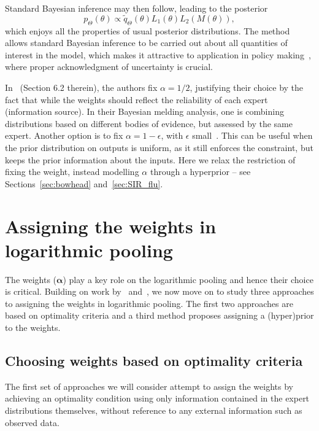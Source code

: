 \documentclass[a4paper, notitlepage, 11pt]{article}
\begin{document}
Standard Bayesian inference may then follow,  leading to the posterior
\begin{equation}
 \label{eq:BMpoolposterior}
 p_{\Theta}(\theta) \propto \tilde{q}_{\Theta}(\theta) L_1(\theta) L_2(M(\theta)),
\end{equation}
which enjoys all the properties of usual posterior distributions.
The method allows standard Bayesian inference to be carried out about all quantities of interest in the model, which makes it attractive to application in policy making~\citep{Alkema2008}, where proper acknowledgment of uncertainty is crucial.

In~\cite{Poole2000} (Section 6.2 therein), the authors fix $\alpha = 1/2$, justifying their choice by the fact that while the weights should reflect the reliability of each expert (information source).
In their Bayesian melding analysis, one is combining distributions based on different bodies of evidence, but assessed by the same expert.
Another option is to fix $\alpha = 1-\epsilon$, with $\epsilon$ small~\citep{Alkema2007}.
This can be useful when the prior distribution on outputs is uniform, as it still enforces the constraint, but keeps the prior information about the inputs.
Here we relax the restriction of fixing the weight, instead modelling $\alpha$ through a hyperprior -- see Sections~\ref{sec:bowhead} and~\ref{sec:SIR_flu}. 

\section{Assigning the weights in logarithmic pooling}
\label{sec:weights}

The weights ($\boldsymbol \alpha$) play a key role on the logarithmic pooling and hence their choice is critical.
Building on work by~\cite{Poole2000,Rufo2012A,Rufo2012B} and~\cite{Abbas2009}, we now move on to study three approaches to assigning the weights in logarithmic pooling.
The first two approaches are based on optimality criteria and a third method proposes assigning a (hyper)prior to the weights.

\subsection{Choosing weights based on optimality criteria}

The first set of approaches we will consider attempt to assign the weights by achieving an optimality condition using only information contained in the expert distributions themselves, without reference to any external information such as observed data.
\end{document}
